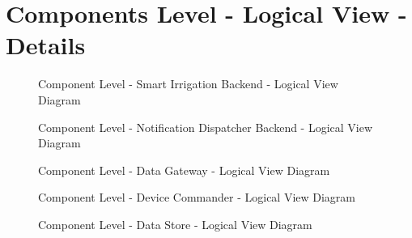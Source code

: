 \chapter{Components Level - Logical View - Details}
\label{AppendixC}

\begin{figure}[H]
   \centering
   \resizebox{\columnwidth}{!}
   {
      
   }
   \caption[Component Level - Smart Irrigation Backend - Logical View Diagram]{Component Level - Smart Irrigation Backend - Logical View Diagram}
   \label{fig:AppendixC:irrig}
\end{figure}

\begin{figure}[H]
   \centering
   \resizebox{\columnwidth}{!}
   {
      
   }
   \caption[Component Level - Notification Dispatcher Backend - Logical View Diagram]{Component Level - Notification Dispatcher Backend - Logical View Diagram}
   \label{fig:AppendixC:notidispatcher}
\end{figure}

\begin{figure}[H]
   \centering
   \resizebox{\columnwidth}{!}
   {
      
   }
   \caption[Component Level - Data Gateway - Logical View Diagram]{Component Level - Data Gateway - Logical View Diagram}
   \label{fig:AppendixC:gateway}
\end{figure}

\begin{figure}[H]
   \centering
   \resizebox{\columnwidth}{!}
   {
      
   }
   \caption[Component Level - Device Commander - Logical View Diagram]{Component Level - Device Commander - Logical View Diagram}
   \label{fig:AppendixC:commander}
\end{figure}

\begin{figure}[H]
   \centering
   \resizebox{\columnwidth}{!}
   {
      
   }
   \caption[Component Level - Data Store - Logical View Diagram]{Component Level - Data Store - Logical View Diagram}
   \label{fig:AppendixC:store}
\end{figure}
